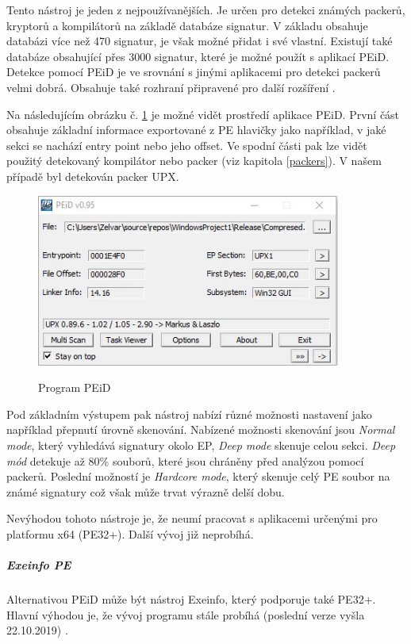 Tento nástroj je jeden z nejpoužívanějších. Je určen pro detekci známých packerů, kryptorů a kompilátorů na základě databáze signatur. V základu obsahuje databázi více než 470 signatur, je však možné přidat i své vlastní. Existují také databáze obsahující přes 3000 signatur, které je možné použít s aplikací PEiD. Detekce pomocí PEiD je ve srovnání s jinými aplikacemi pro detekci packerů velmi dobrá. Obsahuje také rozhraní připravené pro další rozšíření \cite{4654055}. 

Na následujícím obrázku č. \ref{fig:peid} je možné vidět prostředí aplikace PEiD. První část obsahuje základní informace exportované z PE hlavičky jako například, v jaké sekci se nachází entry point nebo jeho offset. Ve spodní části pak lze vidět použitý detekovaný kompilátor nebo packer (viz kapitola \ref{packers}). V našem případě byl detekován packer UPX.

\begin{figure}[!ht]
    \centering
    \caption{Program PEiD}
    \includegraphics[width=100mm,scale=0.5]{Figures/obrazky/PEid.jpg}
    \label{fig:peid}
\end{figure}

Pod základním výstupem pak nástroj nabízí různé možnosti nastavení jako například přepnutí úrovně skenování. Nabízené možnosti skenování jsou \emph{Normal mode}, který vyhledává signatury okolo EP, \emph{Deep mode} skenuje celou sekci. \emph{Deep mód} detekuje až 80\% souborů, které jsou chráněny před analýzou pomocí packerů. Poslední možností je \emph{Hardcore mode}, který skenuje celý PE soubor na známé signatury \cite{peid_info} což však může trvat výrazně delší dobu.

Nevýhodou tohoto nástroje je, že neumí pracovat s aplikacemi určenými pro platformu x64 (PE32+). Další vývoj již neprobíhá.

\subparagraph*{Exeinfo PE}

Alternativou PEiD může být nástroj Exeinfo, který podporuje také PE32+. Hlavní výhodou je, že vývoj programu stále probíhá (poslední verze vyšla 22.10.2019) \cite{exeinfo}. 

